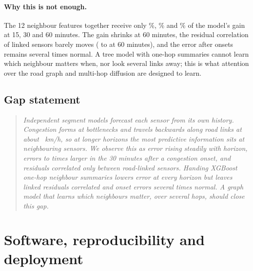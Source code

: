 \documentclass[11pt,a4paper]{article}
\begin{document}
\paragraph{Why this is not enough.}
The 12 neighbour features together receive only \NbShareFifteen\%, \NbShareThirty\% and \NbShareSixty\% of the model's gain at 15, 30 and 60 minutes.
The gain shrinks at 60 minutes, the residual correlation of linked sensors barely moves (\ResidLinkSixtyThree{} to \ResidLinkNbSixty{} at 60 minutes), and the error after onsets remains several times normal.
A tree model with one-hop summaries cannot learn which neighbour matters when, nor look several links away; this is what attention over the road graph \citep{velickovic2018gat} and multi-hop diffusion \citep{li2018dcrnn} are designed to learn.

\subsection{Gap statement}
\begin{quote}\itshape
Independent segment models forecast each sensor from its own history.
Congestion forms at bottlenecks and travels backwards along road links at about \ShockwaveKmh~km/h, so at longer horizons the most predictive information sits at neighbouring sensors.
We observe this as error rising steadily with horizon, errors \OnsetRatioFifteen{} to \OnsetRatioThirty{} times larger in the 30 minutes after a congestion onset, and residuals correlated only between road-linked sensors.
Handing XGBoost one-hop neighbour summaries lowers error at every horizon but leaves linked residuals correlated and onset errors several times normal.
A graph model that learns which neighbours matter, over several hops, should close this gap.
\end{quote}

\section{Software, reproducibility and deployment}\label{sec:system}
\end{document}
